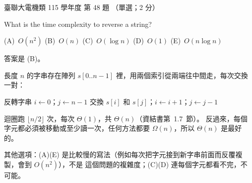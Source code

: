 \begin{pastexam}[label={px:ust-115-ee-ds-48}]{臺聯大電機類 115 學年度 第 48 題}
（單選；2 分）

What is the time complexity to reverse a string?

(A)~$O(n^2)$ \qquad (B)~$O(n)$ \qquad (C)~$O(\log n)$ \qquad (D)~$O(1)$ \qquad (E)~$O(n \log n)$
\end{pastexam}

\begin{pastsoln}
答案是 (B)。

長度 $n$ 的字串存在陣列 $s[0..n-1]$ 裡，用兩個索引從兩端往中間走，每次交換一對：
\begin{pseudo}{反轉字串}
\State $i \gets 0$；$j \gets n - 1$
    \State 交換 $s[i]$ 和 $s[j]$；$i \gets i + 1$；$j \gets j - 1$
\EndWhile
\end{pseudo}
迴圈跑 $\lfloor n/2 \rfloor$ 次，每次 $\Theta(1)$，共 $\Theta(n)$（資結書第~1.7~節）。 反過來，每個
字元都必須被移動或至少讀一次，任何方法都要 $\Omega(n)$，所以 $\Theta(n)$ 是最好的。

其他選項：(A)(E) 是比較慢的寫法（例如每次把字元接到新字串前面而反覆複製，會到 $O(n^2)$），不是
這個問題的複雜度；(C)(D) 連每個字元都看不完，不可能。
\end{pastsoln}

